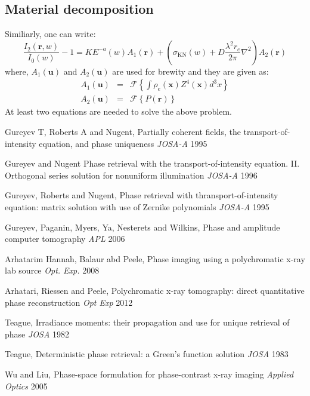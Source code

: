 \documentclass[12pt]{article}
\begin{document}
\subsection{Material decomposition}
Similiarly, one can write:
\begin{equation}
 \frac{I_2(\textbf{r},w)}{I_{0}(w)}-1  = KE^{-a}(w)A_1(\textbf{r})+\left( \sigma_{\text{KN}}(w)+D\frac{\lambda^2r_e}{2\pi}\nabla^2\right)A_2(\textbf{r})
\end{equation}
where, $A_1(\textbf{u})$ and $A_2(\textbf{u})$ are used for brewity and they are given as:
\begin{eqnarray}
 A_1(\textbf{u}) &=& \mathcal{F}\left\lbrace \int\rho_{e}(\textbf{x})Z^4(\textbf{x})d^3x \right\rbrace \\
 A_2(\textbf{u}) &=& \mathcal{F}\left\lbrace P(\textbf{r})\right\rbrace
\end{eqnarray}
At least two equations are needed to solve the above problem.

 \begin{thebibliography}{1}

  \bibitem{} Gureyev T, Roberts A and Nugent, Partially coherent fields, the transport-of-intensity equation, and phase uniqueness {\em JOSA-A} 1995

  \bibitem{} Gureyev and Nugent Phase retrieval with the transport-of-intensity equation. II. Orthogonal series solution for nonuniform illumination {\em JOSA-A} 1996 

  \bibitem{} Gureyev, Roberts and Nugent, Phase retrieval with thransport-of-intensity equation: matrix solution with use of Zernike polynomials {\em JOSA-A} 1995 

  \bibitem{} Gureyev, Paganin, Myers, Ya, Nesterets and Wilkins, Phase and amplitude computer tomography {\em APL} 2006 

  \bibitem{} Arhatarim Hannah, Balaur abd Peele, Phase imaging using a polychromatic x-ray lab source {\em Opt. Exp.} 2008 

  \bibitem{} Arhatari, Riessen and Peele, Polychromatic x-ray tomography: direct quantitative phase reconstruction {\em Opt Exp} 2012 

  \bibitem{} Teague, Irradiance moments: their propagation and use for unique retrieval of phase {\em JOSA} 1982

  \bibitem{} Teague, Deterministic phase retrieval: a Green's function solution {\em JOSA} 1983

  \bibitem{} Wu and Liu, Phase-space formulation for phase-contrast x-ray imaging {\em Applied Optics} 2005
 

  \end{thebibliography}
\end{document}
